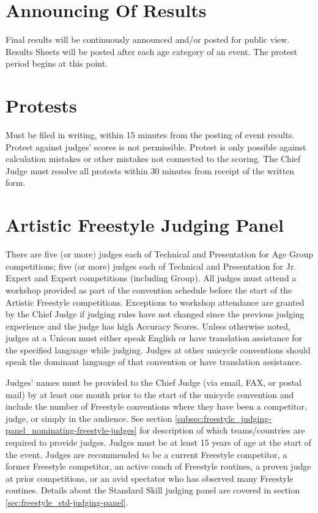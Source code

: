 \section{Announcing Of Results}
Final results will be continuously announced and/or posted for public view.
Results Sheets will be posted after each age category of an event.
The protest period begins at this point.

\section{Protests}
Must be filed in writing, within 15 minutes from the posting of event results.
Protest against judges' scores is not permissible.
Protest is only possible against calculation mistakes or other mistakes not connected to the scoring.
The Chief Judge must resolve all protests within 30 minutes from receipt of the written form.

\section{Artistic Freestyle Judging Panel \label{sec:freestyle_judging-panel}}
There are five (or more) judges each of Technical and Presentation for Age Group competitions; five (or more) judges each of Technical and Presentation for Jr. Expert and Expert competitions (including Group).
All judges must attend a workshop provided as part of the convention schedule before the start of the Artistic Freestyle competitions.
Exceptions to workshop attendance are granted by the Chief Judge if judging rules have not changed since the previous judging experience and the judge has high Accuracy Scores.
Unless otherwise noted, judges at a Unicon must either speak English or have translation assistance for the specified language while judging.
Judges at other unicycle conventions should speak the dominant language of that convention or have translation assistance.

Judges' names must be provided to the Chief Judge (via email, FAX, or postal mail) by at least one month prior to the start of the unicycle convention and include the number of Freestyle conventions where they have been a competitor, judge, or simply in the audience.
See section \ref{subsec:freestyle_judging-panel_nominating-freestyle-judges} for description of which teams/countries are required to provide judges.
Judges must be at least 15 years of age at the start of the event.
Judges are recommended to be a current Freestyle competitor, a former Freestyle competitor, an active coach of Freestyle routines, a proven judge at prior competitions, or an avid spectator who has observed many Freestyle routines.
Details about the Standard Skill judging panel are covered in section \ref{sec:freestyle_std-judging-panel}.

